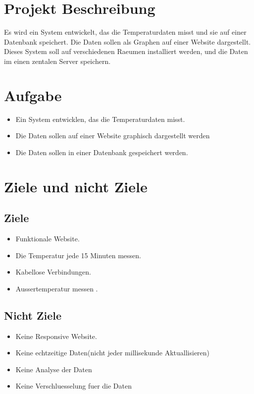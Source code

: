 \section{Projekt Beschreibung}
Es wird ein System entwickelt, das die Temperaturdaten misst und sie auf einer Datenbank speichert. Die Daten sollen als Graphen auf einer Website dargestellt. Dieses System soll auf verschiedenen Raeumen installiert werden, und die Daten im einen zentalen Server speichern.
\section{Aufgabe}
\begin{itemize}
	\item Ein System entwicklen, das die Temperaturdaten misst.
	\item Die Daten sollen auf einer Website graphisch dargestellt werden
	\item Die Daten sollen in einer Datenbank gespeichert werden.
\end{itemize}
\section{Ziele und nicht Ziele}
\subsection{Ziele}
\begin{itemize}
	\item Funktionale Website.
	\item Die Temperatur jede 15 Minuten messen.
	\item Kabellose Verbindungen.
	\item Aussertemperatur messen .
\end{itemize}
\subsection{Nicht Ziele}
\begin{itemize}
	\item Keine Responsive Website.
	\item Keine echtzeitige Daten(nicht jeder millisekunde Aktuallisieren)
	\item Keine Analyse der Daten
	\item Keine Verschluesselung fuer die Daten 
\end{itemize}